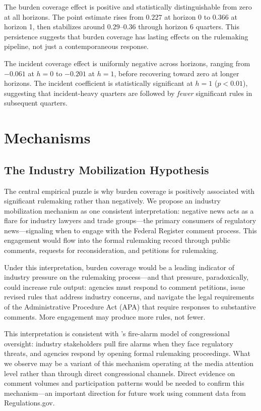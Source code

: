 \documentclass[12pt]{article}
\begin{document}
The burden coverage effect is positive and statistically distinguishable from zero at all horizons. The point estimate rises from $0.227$ at horizon 0 to $0.366$ at horizon 1, then stabilizes around $0.29$--$0.36$ through horizon 6 quarters. This persistence suggests that burden coverage has lasting effects on the rulemaking pipeline, not just a contemporaneous response.

The incident coverage effect is uniformly negative across horizons, ranging from $-0.061$ at $h = 0$ to $-0.201$ at $h = 1$, before recovering toward zero at longer horizons. The incident coefficient is statistically significant at $h = 1$ ($p < 0.01$), suggesting that incident-heavy quarters are followed by \emph{fewer} significant rules in subsequent quarters.

\section{Mechanisms}
\label{sec:mechanisms}

\subsection{The Industry Mobilization Hypothesis}

The central empirical puzzle is why burden coverage is positively associated with significant rulemaking rather than negatively. We propose an industry mobilization mechanism as one consistent interpretation: negative news acts as a flare for industry lawyers and trade groups---the primary consumers of regulatory news---signaling when to engage with the Federal Register comment process. This engagement would flow into the formal rulemaking record through public comments, requests for reconsideration, and petitions for rulemaking.

Under this interpretation, burden coverage would be a leading indicator of industry pressure on the rulemaking process---and that pressure, paradoxically, could increase rule output: agencies must respond to comment petitions, issue revised rules that address industry concerns, and navigate the legal requirements of the Administrative Procedure Act (APA) that require responses to substantive comments. More engagement may produce more rules, not fewer.

This interpretation is consistent with \citet{mccubbins1984police}'s fire-alarm model of congressional oversight: industry stakeholders pull fire alarms when they face regulatory threats, and agencies respond by opening formal rulemaking proceedings. What we observe may be a variant of this mechanism operating at the media attention level rather than through direct congressional channels. Direct evidence on comment volumes and participation patterns would be needed to confirm this mechanism---an important direction for future work using comment data from Regulations.gov.
\end{document}
